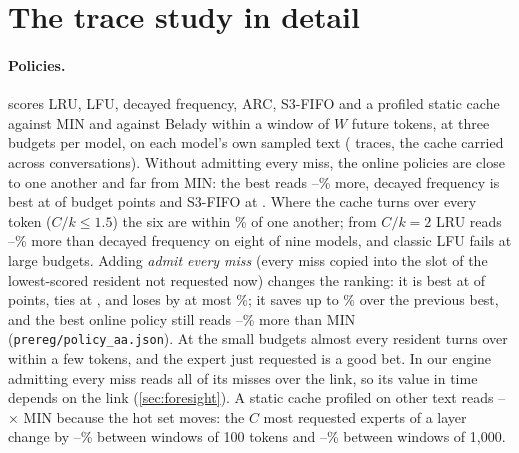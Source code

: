 \section{The trace study in detail}\label{app:traces}


\paragraph{Policies.}  scores LRU, LFU, decayed frequency, ARC, S3-FIFO and a profiled static cache
against MIN and against Belady within a window of $W$ future tokens, at three budgets per model, on each model's own
sampled text (\polModels{} traces, the cache carried across conversations). Without admitting every miss, the online
policies are close to one another and far from MIN: the best reads \polBestOnlineMin--\polBestOnlineMax\% more, decayed
frequency is best at \polDfBest{} of \polCells{} budget points and S3-FIFO at \polSsfBest. Where the cache turns over
every token ($C/k\le1.5$) the six are within \polLowSpreadMax\% of one another; from $C/k{=}2$ LRU reads
\polLruMoreMin--\polLruMoreMax\% more than decayed frequency on eight of nine models, and classic LFU fails at large
budgets. Adding \emph{admit every miss} (every miss copied into the slot of the lowest-scored resident not requested
now) changes the ranking: it is best at \rbPolAaWins{} of \rbPolCells{} points, ties at \rbPolAaTies, and loses by at
most \rbPolAaLossMax\%; it saves up to \rbPolAaGainMax\% over the previous best, and the best online policy still reads
\rbPolBestMin--\rbPolBestMax\% more than MIN (\texttt{prereg/policy\_aa.json}). At the small budgets almost every
resident turns over within a few tokens, and the expert just requested is a good bet. In our engine admitting every
miss reads all of its misses over the link, so its value in time depends on the link (\cref{sec:foresight}). A static
cache profiled on other text reads \polStaticMin--\polStaticMax$\times$ MIN because the hot set moves: the $C$ most
requested experts of a layer change by \driftHundredMin--\driftHundredMax\% between windows of 100 tokens and
\driftThousandMin--\driftThousandMax\% between windows of 1{,}000.

